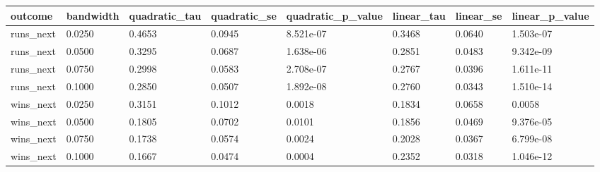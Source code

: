 \begin{tabular}{llllllll}
\toprule
outcome & bandwidth & quadratic\_tau & quadratic\_se & quadratic\_p\_value & linear\_tau & linear\_se & linear\_p\_value \\
\midrule
runs\_next & 0.0250 & 0.4653 & 0.0945 & 8.521e-07 & 0.3468 & 0.0640 & 1.503e-07 \\
runs\_next & 0.0500 & 0.3295 & 0.0687 & 1.638e-06 & 0.2851 & 0.0483 & 9.342e-09 \\
runs\_next & 0.0750 & 0.2998 & 0.0583 & 2.708e-07 & 0.2767 & 0.0396 & 1.611e-11 \\
runs\_next & 0.1000 & 0.2850 & 0.0507 & 1.892e-08 & 0.2760 & 0.0343 & 1.510e-14 \\
wins\_next & 0.0250 & 0.3151 & 0.1012 & 0.0018 & 0.1834 & 0.0658 & 0.0058 \\
wins\_next & 0.0500 & 0.1805 & 0.0702 & 0.0101 & 0.1856 & 0.0469 & 9.376e-05 \\
wins\_next & 0.0750 & 0.1738 & 0.0574 & 0.0024 & 0.2028 & 0.0367 & 6.799e-08 \\
wins\_next & 0.1000 & 0.1667 & 0.0474 & 0.0004 & 0.2352 & 0.0318 & 1.046e-12 \\
\bottomrule
\end{tabular}
